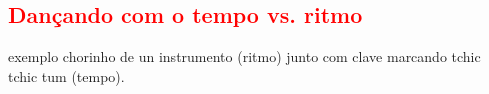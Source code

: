 \subsection{\textcolor{red}{Dançando com o tempo vs. ritmo}}
exemplo chorinho de un instrumento (ritmo) junto com clave marcando tchic tchic tum (tempo).
\begin{comment}
quando começamos a dançar, aprendemos a dançar com o batida, 
depois de um tempo começamos a dançar com o ritmo, eventualmente descobrimos como dançar com a música. 
Claro, estes não são separados; Quando dançamos ao ritmo, 
também dançamos ao  batida. 
E quando dançamos a música, os elementos de batida e ritmo também estão lá.

Ao falar com os dançarinos, acho que às vezes há confusão entre batida e ritmo. 
Simplificando, a batida é o pulso constante que você sente na melodia, 
como um tique-taque do relógio. É com o que você pode bater palmas ou bater o pé em. 
O ritmo é o padrão real que as notas de comprimentos diferentes fazem, 
que em uma música podem ser as mesmas que os padrões de palavras. 
Além do tamanho das notas, o ritmo também é criado quando algumas notas são enfatizadas sobre outras.

Geralmente, a dance music (exceto valsa / vals, claro) tem quatro batidas no bar. 
As batidas 1 e 3 são as batidas fortes (o compás no tango) as batidas 2 e 4 
são as batidas fracas (às vezes chamadas de batidas de costas ou de batidas). 
Em seu nível mais simples, quando dançamos, tendemos a pisar nas batidas 1 e 3. 
(Embora, ao bater palmas, a preferência seja aplaudir a batida de trás).

Claro, tudo isso se aplica a qualquer dança criativa de parceiros, 
não apenas ao tango. Em algumas aulas, às vezes você ouve: 
"Este é um movimento de seis batidas" ou "Este é um movimento de doze batidas". 
Isso só é verdade se você estiver se limitando a dançar mecanicamente e unicamente 
ao batida da música. Se você está dançando ao ritmo, 
quantas batidas levará dependendo de como você trabalha com a música.

É muito fácil cair na armadilha de pensar em padrões de passos e se tornar um 
"dançarino de um e três". (E, infelizmente, a batida fortemente acentuada de boa 
parte do que se passa por dance music tende a encorajar isso ... mas isso é outra 
história para outro post no blog!) Somos dançarinos, não metrônomos.
\end{comment}

